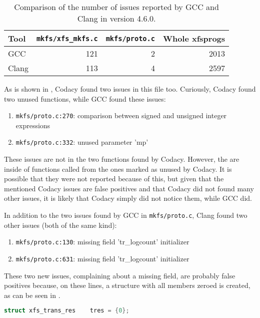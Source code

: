 \begin{table}[h]
\begin{tabular}{|l||r|r||r|}
\hline
Tool & {\tt mkfs/xfs\_mkfs.c} & {\tt mkfs/proto.c} & Whole xfsprogs \\
\hline
GCC & 121 & 2 & 2013 \\
\hline
Clang & 113 & 4 & 2597 \\
\hline
\end{tabular}
\caption{Comparison of the number of issues reported by GCC and Clang in version
4.6.0.}
\label{tab:results:gcc:4.6}
\end{table}

As is shown in , Codacy found two issues in
this file too. Curiously, Codacy found two unused functions, while GCC
found these issues:
\begin{enumerate}
	\item {\tt mkfs/proto.c:270}: comparison between signed and unsigned
		integer expressions
	\item {\tt mkfs/proto.c:332}: unused parameter 'mp'
\end{enumerate}

These issues are not in the two functions found by Codacy. However, the are
inside of functions called from the ones marked as unused by Codacy. It is
possible that they were not reported because of this, but given that the
mentioned Codacy issues are false positives and that Codacy did not found many
other issues, it is likely that Codacy simply did not notice them, while GCC
did.

In addition to the two issues found by GCC in {\tt mkfs/proto.c}, Clang
found two other issues (both of the same kind):
\begin{enumerate}
	\item {\tt mkfs/proto.c:130}: missing field 'tr\_logcount' initializer
	\item {\tt mkfs/proto.c:631}: missing field 'tr\_logcount' initializer
\end{enumerate}

These two new issues, complaining about a missing field, are probably false
positives because, on these lines, a structure with all members zeroed is
created, as can be seen in .

\begin{lstlisting}[frame=none, basicstyle=\footnotesize\ttfamily,
language=C, numbers=none, numberstyle=\tiny\color{black},caption=
{One of the two lines on which Clang reports a missing field in structure
initialization.},
label={lst:results:zeroedStruct}]
struct xfs_trans_res    tres = {0};
\end{lstlisting}

